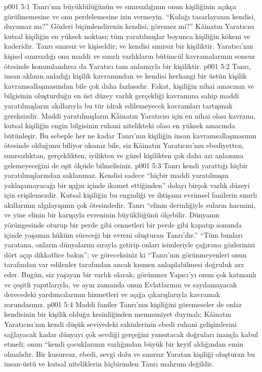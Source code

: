 \vs p001 5:1 Tanrı’nın büyüklülüğünün ve sınırsızlığının onun kişiliğinin açıkça görülmemesine ve onu perdelemesine izin vermeyin. “Kulağı tasarlayanın kendisi, duyamaz mı?” Gözleri biçimlendirenin kendisi, göremez mi?” Kâinatın Yaratıcısı kutsal kişiliğin en yüksek noktası; tüm yaratılmışlar boyunca kişiliğin kökeni ve kaderidir. Tanrı sınırsız ve kişiseldir; ve kendisi sınırsız bir kişiliktir. Yaratıcı’nın kişisel sınırsızlığı onu maddi ve sınırlı varlıkların bütüncül kavramalarının sonsuz ötesinde konumlandırsa da Yaratıcı tam anlamıyla bir kişiliktir.
\vs p001 5:2 Tanrı, insan aklının anladığı kişilik kavramından ve kendisi herhangi bir üstün kişilik kavramsallaşmasından bile çok daha fazlasıdır. Fakat, kişiliğin nihai amacının ve bilgisinin oluşturduğu en üst düzey varlık gerçekliği kavramına sahip maddi yaratılmışların akıllarıyla bu tür idrak edilemeyecek kavramları tartışmak gereksizdir. Maddi yaratılmışların Kâinatın Yaratıcısı için en nihai olası kavramı, kutsal kişiliğin engin bilgisinin ruhani nitelikteki olası en yüksek amacında bütünleşir. Bu sebeple her ne kadar Tanrı’nın kişiliğin insan kavramsallaşmasının ötesinde olduğunu biliyor olsanız bile, siz Kâinatın Yaratıcısı’nın ebediyetten, sınırsızlıktan, gerçeklikten, iyilikten ve güzel kişilikten çok daha azı anlamına gelemeyeceğini de eşit ölçüde bilmelisiniz.
\vs p001 5:3 Tanrı kendi yarattığı hiçbir yaratılmışlarından saklanmaz. Kendisi sadece “hiçbir maddi yaratılmışın yaklaşamayacağı bir ışığın içinde ikamet ettiğinden” dolayı birçok varlık düzeyi için erişilemezdir. Kutsal kişiliğin bu enginliği ve ihtişamı evrimsel fanilerin sınırlı akıllarının algılayışının çok ötesindedir. Tanrı “elinin derinliğiyle suların hacmini, ve yine elinin bir karışıyla evreninin büyüklüğünü ölçebilir. Dünyanın yörüngesinde oturup bir perde gibi cennetleri bir perde gibi kapatıp sonunda içinde yaşamın hüküm süreceği bir evreni oluşturan Tanrı’dır.” “Tüm bunları yaratana, onların dünyalarını sırayla getirip onları isimleriyle çağırana gözlerinizi dört açıp dikkatlice bakın”; ve göreceksiniz ki “Tanrı’nın görünmeyenleri onun tarafından var edilenler tarafından ancak kısmen anlaşılabilmesi doğruluk arz eder. Bugün, siz yaşayan bir varlık olarak; görünmez Yapıcı’yı onun çok katmanlı ve çeşitli yapıtlarıyla, ve aynı zamanda onun Evlatlarının ve sayılamayacak derecedeki yardımcılarının hizmetleri ve açığa çıkarışlarıyla kavramak zorundasınız.
\vs p001 5:4 Maddi faniler Tanrı’nın kişiliğini göremeseler de onlar kendisinin bir kişilik olduğu kesinliğinden memnuniyet duymalı; Kâinatın Yaratıcısı’nın kendi düşük seviyedeki sakinlerinin ebedi ruhani gelişimlerini sağlayacak kadar dünyayı çok sevdiği gerçeğini yansıtacak doğruları inançla kabul etmeli; onun “kendi çocuklarının varlığından büyük bir keyif aldığından emin olmalıdır. Bir kusursuz, ebedi, sevgi dolu ve sınırsız Yaratan kişiliği oluşturan bu insan\hyp{}üstü ve kutsal niteliklerin hiçbirinden Tanrı mahrum değildir.
